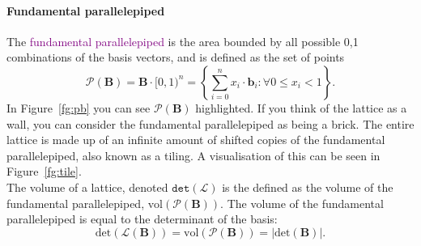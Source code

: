 \documentclass[a4paper, 11pt, openany]{book}
\numberwithin{equation}{section}
\theoremstyle{plain}
\theoremstyle{definition}
\newcommand{\Define}[1]{\textcolor{purple}{#1}}
\begin{document}
\paragraph{Fundamental parallelepiped} The \Define{fundamental parallelepiped} is the area bounded by all possible 0,1 combinations of the basis vectors, and is defined as the set of points $$\mathcal{P}(\textbf{B}) = \textbf{B}\cdot[0,1)^{n} = \left\{ \sum_{i=0}^{n} x_{i}\cdot\textbf{b}_{i}:\forall 0 \le x_{i} < 1 \right\}.$$
In Figure~\ref{fg:pb} you can see $\mathcal{P}(\textbf{B})$ highlighted.
If you think of the lattice as a wall, you can consider the fundamental parallelepiped as being a brick. The entire lattice is made up of an infinite amount of shifted copies of the fundamental parallelepiped, also known as a tiling. A visualisation of this can be seen in Figure~\ref{fg:tile}.
\\
The volume of a lattice, denoted $\mathtt{det}(\mathcal{L})$ is the defined as the volume of the fundamental parallelepiped, $\text{vol}(\mathcal{P}(\textbf{B}))$.
The volume of the fundamental parallelepiped is equal to the determinant of the basis:
$$\text{det}(\mathcal{L}(\textbf{B})) = \text{vol}(\mathcal{P}(\textbf{B})) = |\text{det}(\textbf{B})|. $$
\end{document}
